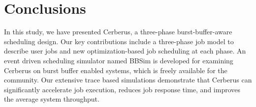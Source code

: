 \section{Conclusions}
\label{Sec:Conclusion}


In this study, we have presented Cerberus, a three-phase burst-buffer-aware scheduling design.
Our key contributions include a three-phase job model to describe user jobs
and new optimization-based job scheduling at each phase.
An event driven scheduling simulator named BBSim is developed for examining
Cerberus on burst buffer enabled systems, which is freely available for the community.
Our extensive trace based simulations demonstrate that
Cerberus can significantly accelerate job execution,
reduces job response time, and improves the average system throughput. 
